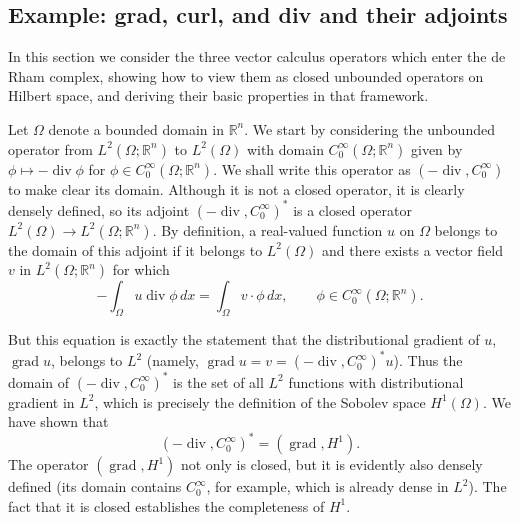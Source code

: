 \subsection{{Example: grad, curl, and div and their adjoints}}\label{sec:vector-operators-adjoints}

{In this section we consider the three vector calculus operators which enter the de Rham complex, showing how to view them as closed unbounded operators on Hilbert space, and deriving their basic properties in that framework.}

{Let $\Omega$ denote a bounded domain in $\mathbb R^n$. We start by considering the unbounded operator from $L^2(\Omega;\mathbb R^n)$ to $L^2(\Omega)$ with domain $C_0^\infty(\Omega;\mathbb R^n)$ given by $\phi\mapsto-\operatorname{div}\phi$ for $\phi\in C_0^\infty(\Omega;\mathbb R^n)$. We shall write this operator as $(-\operatorname{div},C_0^\infty)$ to make clear its domain. Although it is not a closed operator, it is clearly densely defined, so its adjoint $(-\operatorname{div},C_0^\infty)^*$ is a closed operator $L^2(\Omega)\to L^2(\Omega;\mathbb R^n)$. By definition, a real-valued function $u$ on $\Omega$ belongs to the domain of this adjoint if it belongs to $L^2(\Omega)$ and there exists a vector field $v$ in $L^2(\Omega;\mathbb R^n)$ for which}
\[
-\int_\Omega u\operatorname{div}\phi\,dx=\int_\Omega v\cdot\phi\,dx,\qquad\phi\in C_0^\infty(\Omega;\mathbb R^n).
\]

{But this equation is exactly the statement that the distributional gradient of $u$, $\operatorname{grad}u$, belongs to $L^2$ (namely, $\operatorname{grad}u=v=(-\operatorname{div},C_0^\infty)^*u$). Thus the domain of $(-\operatorname{div},C_0^\infty)^*$ is the set of all $L^2$ functions with distributional gradient in $L^2$, which is precisely the definition of the Sobolev space $H^1(\Omega)$. We have shown that}
\[
(-\operatorname{div},C_0^\infty)^*=(\operatorname{grad},H^1).
\]
{The operator $(\operatorname{grad},H^1)$ not only is closed, but it is evidently also densely defined (its domain contains $C_0^\infty$, for example, which is already dense in $L^2$). The fact that it is closed establishes the completeness of $H^1$.}

